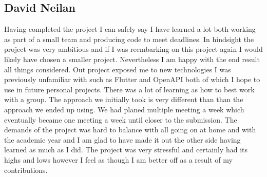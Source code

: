 \subsection{David Neilan}
Having completed the project I can safely say I have learned a lot both working as part of a small team and producing code to meet deadlines. In hindsight the project was very ambitious and if I was reembarking on this project again I would likely have chosen a smaller project. Nevertheless I am happy with the end result all things considered. Out project exposed me to new technologies I was previously unfamiliar with such as Flutter and OpenAPI both of which I hope to use in future personal projects. There was a lot of learning as how to best work with a group. The approach we initially took is very different than than the approach we ended up using. We had planed multiple meeting a week which eventually became one meeting a week until closer to the submission. The demands of the project was hard to balance with all going on at home and with the academic year and I am glad to have made it out the other side having learned as much as I did. The project was very stressful and certainly had its highs and lows however I feel as though I am better off as a result of my contributions.

